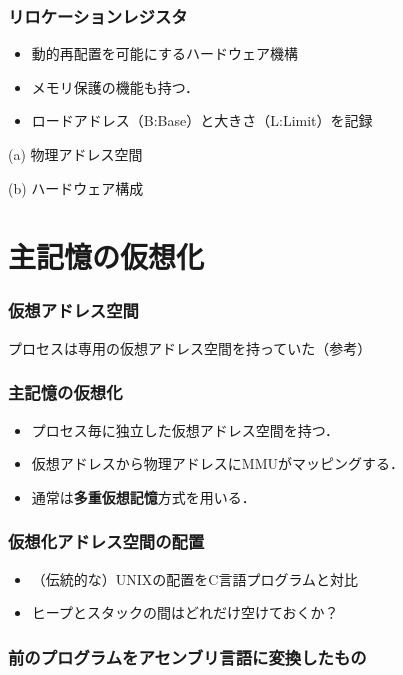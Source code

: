 \documentclass[unicode,handout]{beamer}                   %
\begin{document}
\begin{frame}
  \frametitle{リロケーションレジスタ}
  \begin{itemize}
    \item 動的再配置を可能にするハードウェア機構
    \item メモリ保護の機能も持つ．
    \item ロードアドレス（B:Base）と大きさ（L:Limit）を記録
  \end{itemize}
  \begin{minipage}{0.49\columnwidth}
    \centerline{(a) 物理アドレス空間}
  \end{minipage}
  \begin{minipage}{0.49\columnwidth}
    \centerline{(b) ハードウェア構成}
  \end{minipage}
  \vfill
\end{frame}

\section{主記憶の仮想化}
\begin{frame}
  \frametitle{仮想アドレス空間}
  プロセスは専用の仮想アドレス空間を持っていた（参考）
\end{frame}
\begin{frame}
  \frametitle{主記憶の仮想化}
  \begin{itemize}
    \item プロセス毎に独立した仮想アドレス空間を持つ．
    \item 仮想アドレスから物理アドレスにMMUがマッピングする．
    \item 通常は{\bf 多重仮想記憶}方式を用いる．
  \end{itemize}
\end{frame}

\begin{frame}
  \frametitle{仮想化アドレス空間の配置}
  \begin{itemize}
    \item （伝統的な）UNIXの配置をC言語プログラムと対比
    \item ヒープとスタックの間はどれだけ空けておくか？
  \end{itemize}
\end{frame}

\begin{frame}
  \frametitle{前のプログラムをアセンブリ言語に変換したもの}
\end{frame}
\end{document}
